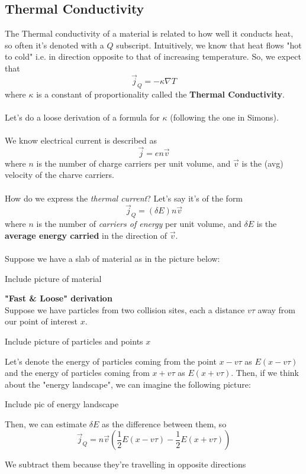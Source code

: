 \documentclass[11pt]{article}
\begin{document}
\subsection{Thermal Conductivity}
The Thermal conductivity of a material is related to how well it conducts heat, so often it's denoted with a $Q$ subscript. Intuitively, we know that heat flows "hot to cold" i.e. in direction opposite to that of increasing temperature. So, we expect that $$ \vec{j}_{Q} = - \kappa \nabla T $$ where $\kappa$ is a constant of proportionality called the \textbf{Thermal Conductivity}.
\\
\\
Let's do a loose derivation of a formula for $\kappa$ (following the one in Simons).
\\
\\
We know electrical current is described as $$ \vec{j} = e n \vec{v} $$ where $n$ is the number of charge carriers per unit volume, and $\vec{v}$ is the (avg) velocity of the charve carriers. 
\\
\\
How do we express the \textit{thermal current}? Let's say it's of the form $$ \vec{j}_{Q} = (\delta E) n \vec{v} $$ where $n$ is the number of \textit{carriers of energy} per unit volume, and $\delta E$ is the \textbf{average energy carried} in the direction of $\vec{v}$.
\\
\\
Suppose we have a slab of material as in the picture below:
\begin{center}
  Include picture of material
\end{center}

\textbf{"Fast \& Loose" derivation}\\
Suppose we have particles from two collision sites, each a distance $v\tau$ away from our point of interest $x$. 
\begin{center}
  Include picture of particles and points $x$
\end{center}

Let's denote the energy of particles coming from the point $x - v\tau$ as $E(x - v\tau)$ and the energy of particles coming from $x + v\tau$ as $E(x + v \tau)$. Then, if we think about the "energy landscape", we can imagine the following picture:
\begin{center}
  Include pic of energy landscape
\end{center}

Then, we can estimate $\delta E$ as the difference between them, so
\[ \vec{j}_{Q} = n\vec{v} \left( \frac{1}{2} E(x - v\tau) - \frac{1}{2} E(x + v\tau) \right) \]  \begin{note}
  {We subtract them because they're travelling in opposite directions}
\end{note}
\end{document}
